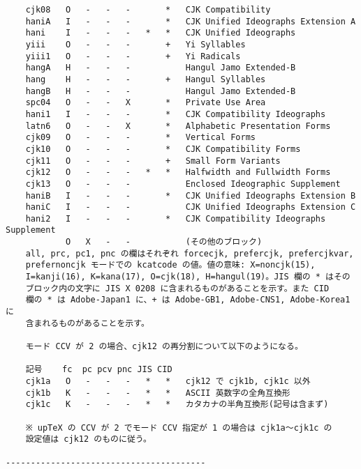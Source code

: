 \documentclass[uplatex,dvipdfmx,a4paper]{jsarticle}
\begin{document}
\begin{verbatim}
    cjk08   O   -   -   -       *   CJK Compatibility
    haniA   I   -   -   -       *   CJK Unified Ideographs Extension A
    hani    I   -   -   -   *   *   CJK Unified Ideographs
    yiii    O   -   -   -       +   Yi Syllables
    yiii1   O   -   -   -       +   Yi Radicals
    hangA   H   -   -   -           Hangul Jamo Extended-B
    hang    H   -   -   -       +   Hangul Syllables
    hangB   H   -   -   -           Hangul Jamo Extended-B
    spc04   O   -   -   X       *   Private Use Area
    hani1   I   -   -   -       *   CJK Compatibility Ideographs
    latn6   O   -   -   X       *   Alphabetic Presentation Forms
    cjk09   O   -   -   -       *   Vertical Forms
    cjk10   O   -   -   -       *   CJK Compatibility Forms
    cjk11   O   -   -   -       +   Small Form Variants
    cjk12   O   -   -   -   *   *   Halfwidth and Fullwidth Forms
    cjk13   O   -   -   -           Enclosed Ideographic Supplement
    haniB   I   -   -   -       *   CJK Unified Ideographs Extension B
    haniC   I   -   -   -           CJK Unified Ideographs Extension C
    hani2   I   -   -   -       *   CJK Compatibility Ideographs Supplement
            O   X   -   -           (その他のブロック)
    all, prc, pc1, pnc の欄はそれぞれ forcecjk, prefercjk, prefercjkvar,
    prefernoncjk モードでの kcatcode の値。値の意味: X=noncjk(15),
    I=kanji(16), K=kana(17), O=cjk(18), H=hangul(19)。JIS 欄の * はその
    ブロック内の文字に JIS X 0208 に含まれるものがあることを示す。また CID
    欄の * は Adobe-Japan1 に、+ は Adobe-GB1, Adobe-CNS1, Adobe-Korea1 に
    含まれるものがあることを示す。

    モード CCV が 2 の場合、cjk12 の再分割について以下のようになる。

    記号    fc  pc pcv pnc JIS CID
    cjk1a   O   -   -   -   *   *   cjk12 で cjk1b, cjk1c 以外
    cjk1b   K   -   -   -   *   *   ASCII 英数字の全角互換形
    cjk1c   K   -   -   -   *   *   カタカナの半角互換形(記号は含まず)

    ※ upTeX の CCV が 2 でモード CCV 指定が 1 の場合は cjk1a～cjk1c の
    設定値は cjk12 のものに従う。

----------------------------------------
\end{verbatim}
\end{document}
